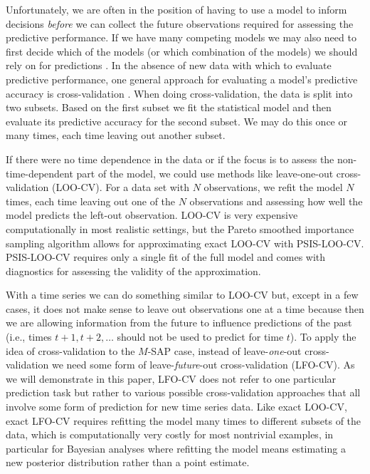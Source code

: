 \documentclass[american,]{article}
\begin{document}
Unfortunately, we are often in the position of having to use a model to inform
decisions \emph{before} we can collect the future observations required for assessing
the predictive performance. If we have many competing models we may also need to
first decide which of the models (or which combination of the models) we should
rely on for predictions \citep{geisser1979, hoeting1999, vehtari2002, ando2010, vehtari2012}. In the absence of new data with which to evaluate predictive
performance, one general approach for evaluating a model's predictive accuracy
is cross-validation \citep{vehtari2002}. When doing cross-validation, the data is
split into two subsets. Based on the first subset we fit the statistical model
and then evaluate its predictive accuracy for the second subset. We may do this
once or many times, each time leaving out another subset.

If there were no time dependence in the data or if the focus is to assess the
non-time-dependent part of the model, we could use methods like leave-one-out
cross-validation (LOO-CV). For a data set with \(N\) observations, we refit the
model \(N\) times, each time leaving out one of the \(N\) observations and assessing
how well the model predicts the left-out observation. LOO-CV is very expensive
computationally in most realistic settings, but the Pareto smoothed importance
sampling \citep[PSIS;][]{vehtari2017loo, vehtari2017psis} algorithm allows for
approximating exact LOO-CV with PSIS-LOO-CV. PSIS-LOO-CV requires only a single
fit of the full model and comes with diagnostics for assessing the validity of
the approximation.

With a time series we can do something similar to LOO-CV but, except in a few
cases, it does not make sense to leave out observations one at a time because
then we are allowing information from the future to influence predictions of the
past (i.e., times \(t + 1, t+2, \ldots\) should not be used to predict for time
\(t\)). To apply the idea of cross-validation to the \(M\)-SAP case, instead of
leave-\emph{one}-out cross-validation we need some form of leave-\emph{future}-out
cross-validation (LFO-CV). As we will demonstrate in this paper, LFO-CV
does not refer to one particular prediction task but rather to various possible
cross-validation approaches that all involve some form of prediction for new
time series data. Like exact LOO-CV, exact LFO-CV requires refitting the model
many times to different subsets of the data, which is computationally very
costly for most nontrivial examples, in particular for Bayesian analyses where
refitting the model means estimating a new posterior distribution rather than a
point estimate.
\end{document}
